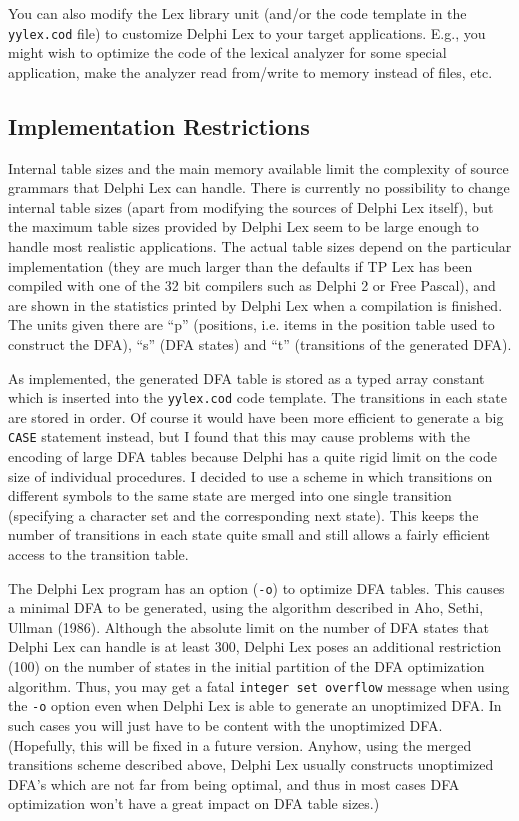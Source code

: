 \documentclass[a4paper]{article}
\begin{document}
You can also modify the Lex library unit (and/or the code template in the
\verb"yylex.cod" file) to customize Delphi Lex to your target applications. E.g.,
you might wish to optimize the code of the lexical analyzer for some
special application, make the analyzer read from/write to memory instead
of files, etc.

\subsection{Implementation Restrictions}

Internal table sizes and the main memory available limit the complexity of
source grammars that Delphi Lex can handle. There is currently no possibility to
change internal table sizes (apart from modifying the sources of Delphi Lex
itself), but the maximum table sizes provided by Delphi Lex seem to be large
enough to handle most realistic applications. The actual table sizes depend on
the particular implementation (they are much larger than the defaults if TP
Lex has been compiled with one of the 32 bit compilers such as Delphi 2 or
Free Pascal), and are shown in the statistics printed by Delphi Lex when a
compilation is finished. The units given there are ``p'' (positions, i.e.
items in the position table used to construct the DFA), ``s'' (DFA states) and
``t'' (transitions of the generated DFA).

As implemented, the generated DFA table is stored as a typed array constant
which is inserted into the \verb"yylex.cod" code template. The transitions in
each state are stored in order. Of course it would have been more efficient to
generate a big \verb"CASE" statement instead, but I found that this may cause
problems with the encoding of large DFA tables because Delphi has
a quite rigid limit on the code size of individual procedures. I decided to
use a scheme in which transitions on different symbols to the same state are
merged into one single transition (specifying a character set and the
corresponding next state). This keeps the number of transitions in each state
quite small and still allows a fairly efficient access to the transition
table.

The Delphi Lex program has an option (\verb"-o") to optimize DFA tables. This
causes a minimal DFA to be generated, using the algorithm described in Aho,
Sethi, Ullman (1986). Although the absolute limit on the number of DFA states
that Delphi Lex can handle is at least 300, Delphi Lex poses an additional restriction
(100) on the number of states in the initial partition of the DFA optimization
algorithm. Thus, you may get a fatal \verb"integer set overflow" message when
using the \verb"-o" option even when Delphi Lex is able to generate an unoptimized
DFA. In such cases you will just have to be content with the unoptimized DFA.
(Hopefully, this will be fixed in a future version. Anyhow, using the merged
transitions scheme described above, Delphi Lex usually constructs unoptimized
DFA's which are not far from being optimal, and thus in most cases DFA
optimization won't have a great impact on DFA table sizes.)
\end{document}
